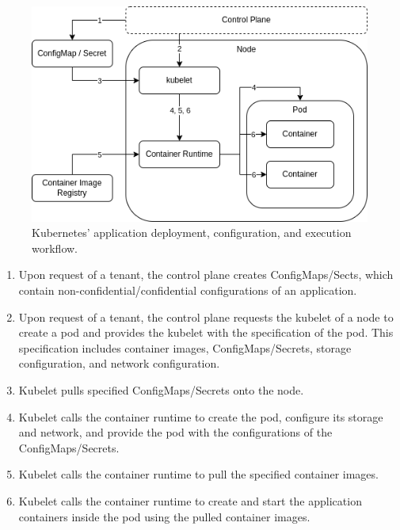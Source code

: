 \begin{figure}[H]
  \centering
  \includegraphics[width=0.7\linewidth]{resources/kubernetes-application-orchestration.drawio.png}
  \caption{Kubernetes' application deployment, configuration, and execution workflow.}
  \label{fig:kubernetes-application-orchestration}
\end{figure}

\begin{enumerate}
  \item Upon request of a tenant, the control plane creates ConfigMaps/Sects,
        which contain non-confidential/confidential configurations of an
        application.
  \item Upon request of a tenant, the control plane requests the kubelet of a
        node to create a pod and provides the kubelet with the specification of
        the pod. This specification includes container images,
        ConfigMaps/Secrets, storage configuration, and network configuration.
  \item Kubelet pulls specified ConfigMaps/Secrets onto the node.
  \item Kubelet calls the container runtime to create the pod, configure its
        storage and network, and provide the pod with the configurations of the
        ConfigMaps/Secrets.
  \item Kubelet calls the container runtime to pull the specified container
        images.
  \item Kubelet calls the container runtime to create and start the application
        containers inside the pod using the pulled container images.
\end{enumerate}
